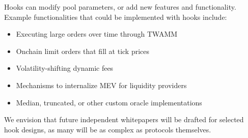 \documentclass[sigconf,nonacm,prologue,table]{acmart}
\numberwithin{equation}{section}
\theoremstyle{definition}
\theoremstyle{remark}
\begin{document}
Hooks can modify pool parameters, or add new features and functionality. Example functionalities that could be implemented with hooks include: 
\begin{itemize}
\item Executing large orders over time through TWAMM 
\item Onchain limit orders that fill at tick prices
\item Volatility-shifting dynamic fees
\item Mechanisms to internalize MEV for liquidity providers
\item Median, truncated, or other custom oracle implementations
\end{itemize}

We envision that future independent whitepapers will be drafted for selected hook designs, as many will be as complex as protocols themselves.
\end{document}
